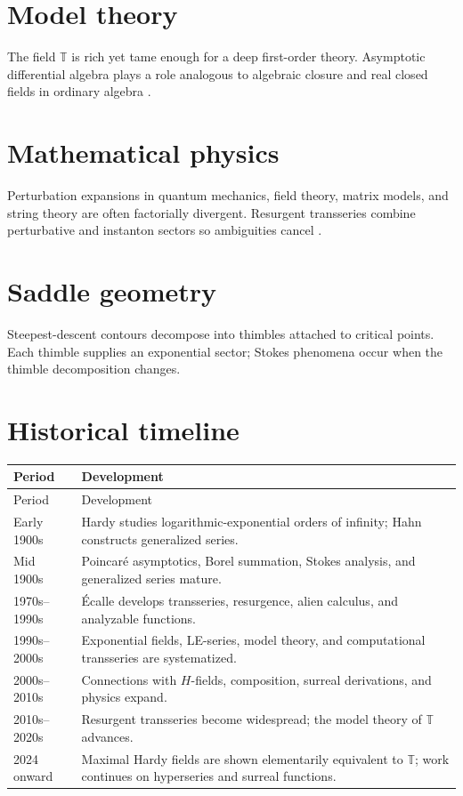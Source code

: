 \documentclass[11pt,oneside,openany]{book}
\newcommand{\T}{\mathbb{T}}
\theoremstyle{plain}
\theoremstyle{definition}
\theoremstyle{remark}
\begin{document}
\section{Model theory}
The field $\T$ is rich yet tame enough for a deep first-order theory. Asymptotic differential algebra plays a role analogous to algebraic closure and real closed fields in ordinary algebra \cite{ADH2017}.

\section{Mathematical physics}
Perturbation expansions in quantum mechanics, field theory, matrix models, and string theory are often factorially divergent. Resurgent transseries combine perturbative and instanton sectors so ambiguities cancel \cite{AnicetoBasarSchiappa,Dorigoni}.

\section{Saddle geometry}
Steepest-descent contours decompose into thimbles attached to critical points. Each thimble supplies an exponential sector; Stokes phenomena occur when the thimble decomposition changes.

\section{Historical timeline}
\begin{longtable}{p{}p{}}
\toprule
Period & Development\\
\midrule
\endfirsthead
\toprule
Period & Development\\
\midrule
\endhead
Early 1900s & Hardy studies logarithmic-exponential orders of infinity; Hahn constructs generalized series.\\
Mid 1900s & Poincaré asymptotics, Borel summation, Stokes analysis, and generalized series mature.\\
1970s--1990s & Écalle develops transseries, resurgence, alien calculus, and analyzable functions.\\
1990s--2000s & Exponential fields, LE-series, model theory, and computational transseries are systematized.\\
2000s--2010s & Connections with $H$-fields, composition, surreal derivations, and physics expand.\\
2010s--2020s & Resurgent transseries become widespread; the model theory of $\T$ advances.\\
2024 onward & Maximal Hardy fields are shown elementarily equivalent to $\T$; work continues on hyperseries and surreal functions.\\
\bottomrule
\end{longtable}
\end{document}
